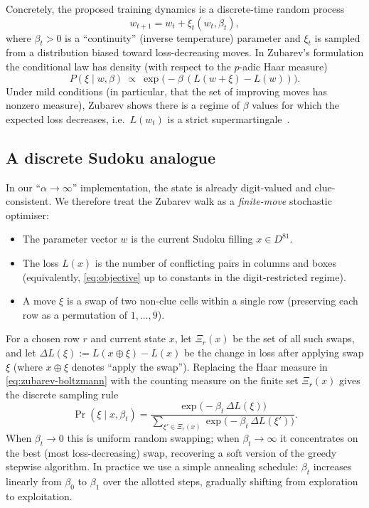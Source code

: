 \documentclass[11pt]{article}
\begin{document}
Concretely, the proposed training dynamics is a discrete-time random process
\begin{equation}
w_{t+1} = w_t + \xi_t(w_t,\beta_t),
\label{eq:zubarev-walk}
\end{equation}
where $\beta_t>0$ is a ``continuity'' (inverse temperature) parameter and $\xi_t$ is sampled from a distribution biased toward loss-decreasing moves. In Zubarev's formulation the conditional law has density (with respect to the $p$-adic Haar measure)
\begin{equation}
P(\xi \mid w,\beta)\ \propto\ \exp\!\bigl(-\beta\,(L(w+\xi)-L(w))\bigr).
\label{eq:zubarev-boltzmann}
\end{equation}
Under mild conditions (in particular, that the set of improving moves has nonzero measure), Zubarev shows there is a regime of $\beta$ values for which the expected loss decreases, i.e.\ $L(w_t)$ is a strict supermartingale~\cite{zubarev2025padic}.

\subsection{A discrete Sudoku analogue}
In our ``$\alpha\to\infty$'' implementation, the state is already digit-valued and clue-consistent. We therefore treat the Zubarev walk as a \emph{finite-move} stochastic optimiser:
\begin{itemize}
    \item The parameter vector $w$ is the current Sudoku filling $x\in D^{81}$.
    \item The loss $L(x)$ is the number of conflicting pairs in columns and boxes (equivalently, \eqref{eq:objective} up to constants in the digit-restricted regime).
    \item A move $\xi$ is a swap of two non-clue cells within a single row (preserving each row as a permutation of $1,\dots,9$).
\end{itemize}

For a chosen row $r$ and current state $x$, let $\Xi_r(x)$ be the set of all such swaps, and let $\Delta L(\xi) := L(x\oplus\xi)-L(x)$ be the change in loss after applying swap $\xi$ (where $x\oplus\xi$ denotes ``apply the swap''). Replacing the Haar measure in \eqref{eq:zubarev-boltzmann} with the counting measure on the finite set $\Xi_r(x)$ gives the discrete sampling rule
\begin{equation}
\Pr(\xi \mid x,\beta_t) = \frac{\exp\!\bigl(-\beta_t\,\Delta L(\xi)\bigr)}{\sum_{\xi'\in\Xi_r(x)} \exp\!\bigl(-\beta_t\,\Delta L(\xi')\bigr)}.
\label{eq:zubarev-discrete}
\end{equation}
When $\beta_t\to 0$ this is uniform random swapping; when $\beta_t\to\infty$ it concentrates on the best (most loss-decreasing) swap, recovering a soft version of the greedy stepwise algorithm. In practice we use a simple annealing schedule: $\beta_t$ increases linearly from $\beta_0$ to $\beta_1$ over the allotted steps, gradually shifting from exploration to exploitation.
\end{document}
